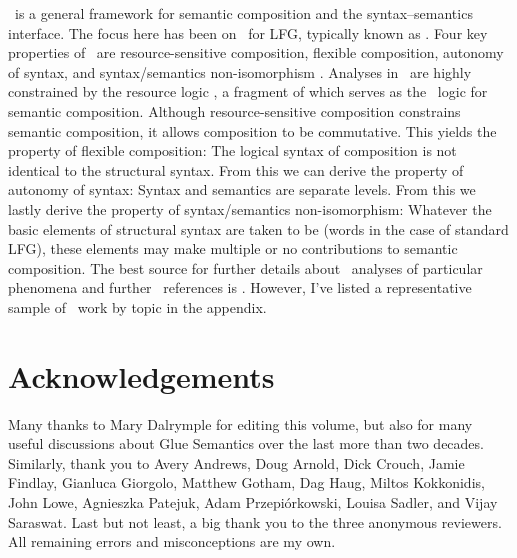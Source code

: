 \documentclass[output=paper,hidelinks]{langscibook}
\begin{document}
\glues\ is a general framework for semantic composition and the
syntax--semantics interface. The focus here has been on \glue\ for
LFG, typically known as \lfgglue. Four key properties of \glues\ are
resource-sensitive composition, flexible composition, autonomy of
syntax, and syntax/semantics non-isomorphism
\citep[324]{asudeh22}. Analyses in \glues\ are highly constrained by
the resource logic , a fragment of which serves as
the \glue\ logic for semantic composition. Although resource-sensitive
composition constrains semantic composition, it allows composition to
be commutative. This yields the property of flexible composition: The
logical syntax of composition is not identical to the structural
syntax. From this we can derive the property of autonomy of syntax:
Syntax and semantics are separate levels. From this we lastly derive
the property of syntax/semantics non-isomorphism: Whatever the basic
elements of structural syntax are taken to be (words in the case of
standard LFG), these elements may make multiple or no contributions to
semantic composition. The best source for further details about \glue\
analyses of particular phenomena and further \glue\ references is
\citet{DLM:LFG}. However, I've listed a representative sample
of \glue\ work by topic in the appendix.

\section*{Acknowledgements}

Many thanks to Mary Dalrymple for editing this volume, but also for
many useful discussions about Glue Semantics over the last more than
two decades. Similarly, thank you to Avery Andrews, Doug Arnold, Dick Crouch, Jamie
Findlay, Gianluca Giorgolo, Matthew Gotham, Dag Haug, Miltos
Kokkonidis, John Lowe, Agnieszka Patejuk, Adam Przepi\'{o}rkowski,
Louisa Sadler, and
Vijay Saraswat. Last but not least, a big thank you to the three
anonymous reviewers. All remaining errors and misconceptions are my
own.
\end{document}

